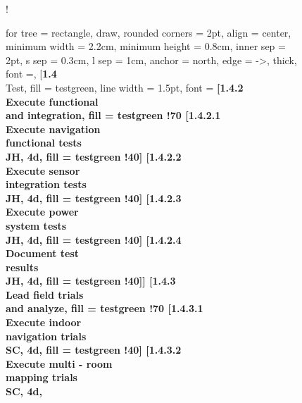 \begin{figure}[H]
\centering
\resizebox{\textwidth} { ! }
{
\begin { forest }
  for
    tree =
        {
            rectangle,
            draw,
            rounded corners = 2pt,
            align = center,
            minimum width = 2.2cm,
            minimum height = 0.8cm,
            inner sep = 2pt,
            s sep = 0.3cm,
            l sep = 1cm,
            anchor = north,
            edge = {->, thick},
            font =\scriptsize,
        }[{\textbf{1.4}\\Test}, fill = testgreen, line width = 1.5pt,
          font =\scriptsize\bfseries
              [{\textbf{1.4.2}\\Execute functional\\and integration},
               fill = testgreen !70
                   [{\textbf{1.4.2.1}\\Execute navigation\\functional
                            tests\\{\tiny JH, 4d}},
                    fill = testgreen !40]
                   [{\textbf{1.4.2.2}\\Execute sensor\\integration
                            tests\\{\tiny JH, 4d}},
                    fill = testgreen !40]
                   [{\textbf{1.4.2.3}\\Execute power\\system tests\\{\tiny JH,
                                                                     4d}},
                    fill = testgreen !40]
                   [{\textbf{1.4.2.4}\\Document test\\results\\{\tiny JH, 4d}},
                    fill = testgreen !40]]
              [{\textbf{1.4.3}\\Lead field trials\\and analyze},
               fill = testgreen !70
                   [{\textbf{1.4.3.1}\\Execute indoor\\navigation
                            trials\\{\tiny SC, 4d}},
                    fill = testgreen !40]
                   [{\textbf{1.4.3.2}\\Execute multi -
                        room\\mapping trials\\{\tiny SC, 4d}},

\end{ forest }}
\end{figure}
